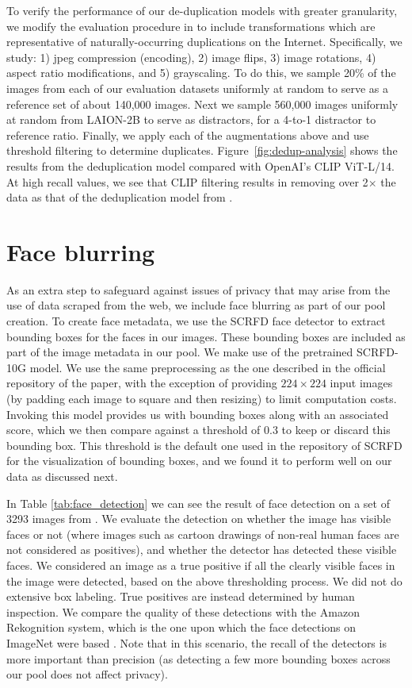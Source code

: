 To verify the performance of our de-duplication models with greater granularity, we modify the evaluation procedure in \citet{douze2021isc} to include transformations which are representative of naturally-occurring duplications on the Internet. Specifically, we study: 1) jpeg compression (encoding), 2) image flips, 3) image rotations, 4) aspect ratio modifications, and 5) grayscaling. To do this, we sample 20\% of the images from each of our evaluation datasets uniformly at random to serve as a reference set of about 140,000 images. Next we sample 560,000 images uniformly at random from LAION-2B to serve as distractors, for a 4-to-1 distractor to reference ratio. Finally, we apply each of the augmentations above and use threshold filtering to determine duplicates. Figure~\ref{fig:dedup-analysis} shows the results from the deduplication model \cite{Yokoo2021Dedup} compared with OpenAI's CLIP ViT-L/14. At high recall values, we see that CLIP filtering results in removing over 2$\times$ the data as that of the deduplication model from \citet{Yokoo2021Dedup}.

\section{Face blurring}
\label{app:face}

As an extra step to safeguard against issues of privacy that may arise from the use of data scraped from the web, we include face blurring as part of our pool creation. To create face metadata, we use the SCRFD face detector \cite{guo2021sample} to extract bounding boxes for the faces in our images. These bounding boxes are included as part of the image metadata in our pool. We make use of the pretrained SCRFD-10G model. We use the same preprocessing as the one described in the official repository of the paper, with the exception of providing $224 \times 224$ input images (by padding each image to square and then resizing) to limit computation costs. Invoking this model provides us with bounding boxes along with an associated score, which we then compare against a threshold of $0.3$ to keep or discard this bounding box. This threshold is the default one used in the repository of SCRFD for the visualization of bounding boxes, and we found it to perform well on our data as discussed next.

In Table \ref{tab:face_detection} we can see the result of face detection on a set of 3293 images from \pool. We evaluate the detection on whether the image has visible faces or not (where images such as cartoon drawings of non-real human faces are not considered as positives), and whether the detector has detected these visible faces. We considered an image as a true positive if all the clearly visible faces in the image were detected, based on the above thresholding process.
We did not do extensive box labeling. True positives are instead determined by human inspection.
We compare the quality of these detections with the Amazon Rekognition system, which is the one upon which the face detections on ImageNet were based \cite{yang2022study}. Note that in this scenario, the recall of the detectors is more important than precision (as detecting a few more bounding boxes across our pool does not affect privacy).

